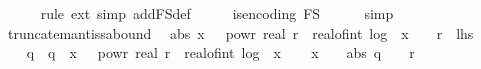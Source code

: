 \begin{isabellebody}
\ \ \ \ \isamarkupfalse%
\ {\isacharparenleft}{\kern0pt}rule\ ext{\isacharcomma}{\kern0pt}\ simp\ add{\isacharcolon}{\kern0pt}F\isactrlsub S{\isacharunderscore}{\kern0pt}def{\isacharparenright}{\kern0pt}\isanewline
\ \ \isamarkupfalse%
\ \isamarkupfalse%
\ {\isachardoublequoteopen}is{\isacharunderscore}{\kern0pt}encoding\ F\isactrlsub S{\isachardoublequoteclose}\isanewline
\ \ \ \ \isamarkupfalse%
\ simp\isanewline
{}\isamarkupfalse%
%
\endisatagproof
{\isafoldproof}%
%
\isadelimproof
\isanewline
%
\endisadelimproof
\isanewline
{}\isamarkupfalse%
\ truncate{\isacharunderscore}{\kern0pt}mantissa{\isacharunderscore}{\kern0pt}bound{\isacharcolon}{\kern0pt}\isanewline
\ \ {\isachardoublequoteopen}abs\ {\isacharparenleft}{\kern0pt}{\isasymlfloor}x\ {\isacharasterisk}{\kern0pt}\ {}\ powr\ {\isacharparenleft}{\kern0pt}real\ r\ {\isacharminus}{\kern0pt}\ real{\isacharunderscore}{\kern0pt}of{\isacharunderscore}{\kern0pt}int\ {\isasymlfloor}log\ {}\ {\isasymbar}x{\isasymbar}{\isasymrfloor}{\isacharparenright}{\kern0pt}{\isasymrfloor}{\isacharparenright}{\kern0pt}\ {\isasymle}\ {}\ {\isacharcircum}{\kern0pt}\ {\isacharparenleft}{\kern0pt}r{\isacharplus}{\kern0pt}{}{\isacharparenright}{\kern0pt}{\isachardoublequoteclose}\ {\isacharparenleft}{\kern0pt}\ {\isachardoublequoteopen}{\isacharquery}{\kern0pt}lhs\ {\isasymle}\ {\isacharunderscore}{\kern0pt}{\isachardoublequoteclose}{\isacharparenright}{\kern0pt}\isanewline
%
\isadelimproof
%
\endisadelimproof
%
\isatagproof
{}\isamarkupfalse%
\ {\isacharminus}{\kern0pt}\isanewline
\ \ \isamarkupfalse%
\ q\ \ {\isachardoublequoteopen}q\ {\isacharequal}{\kern0pt}\ {\isasymlfloor}x\ {\isacharasterisk}{\kern0pt}\ {}\ powr\ {\isacharparenleft}{\kern0pt}real\ r\ {\isacharminus}{\kern0pt}\ real{\isacharunderscore}{\kern0pt}of{\isacharunderscore}{\kern0pt}int\ {\isacharparenleft}{\kern0pt}{\isasymlfloor}log\ {}\ {\isasymbar}x{\isasymbar}{\isasymrfloor}{\isacharparenright}{\kern0pt}{\isacharparenright}{\kern0pt}{\isasymrfloor}{\isachardoublequoteclose}\isanewline
\isanewline
\ \ \isamarkupfalse%
\ {\isachardoublequoteopen}x\ {\isachargreater}{\kern0pt}\ {}\ {\isasymLongrightarrow}\ abs\ q\ {\isasymle}\ {}\ {\isacharcircum}{\kern0pt}\ {\isacharparenleft}{\kern0pt}r\ {\isacharplus}{\kern0pt}\ {}{\isacharparenright}{\kern0pt}{\isachardoublequoteclose}\isanewline

\end{isabellebody}
